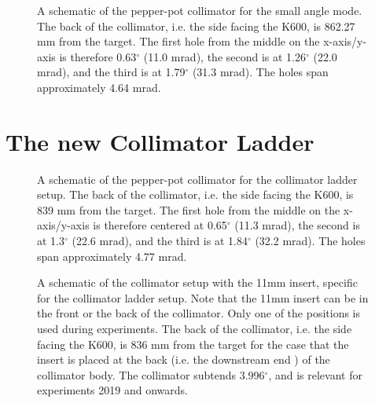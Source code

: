 \documentclass[11pt]{report}
\begin{document}
\begin{figure}[!ht]
\centerline{\vspace{0cm}\hspace{0cm}
}
\centering
\caption{A schematic of the pepper-pot collimator for the small angle mode.
The back of the collimator, i.e. the side facing the K600, is 862.27 mm from the target.  
The first hole from the middle on the x-axis/y-axis is therefore  
0.63$^{\circ}$ (11.0 mrad), 
the second is at 1.26$^{\circ}$ (22.0 mrad), 
and the third is at 1.79$^{\circ}$ (31.3 mrad). 
The holes span approximately 4.64 mrad. 
}
\label{fig:collimator-pepperpot-smallangle}
\end{figure} 

\clearpage


\section{The new Collimator Ladder}

\begin{figure}[!ht]
\centerline{\vspace{0cm}\hspace{0cm}
}
\centering
\caption{A schematic of the pepper-pot collimator for the collimator ladder setup.
The back of the collimator, i.e. the side facing the K600, is 839 mm from the target.  
The first hole from the middle on the x-axis/y-axis is therefore centered at  
0.65$^{\circ}$ (11.3 mrad), 
the second is at 1.3$^{\circ}$ (22.6 mrad), 
and the third is at 1.84$^{\circ}$ (32.2 mrad). 
The holes span approximately 4.77 mrad. 
}
\label{fig:collimatorladder-pepperpot}
\end{figure} 


\begin{figure}[!ht]
\centerline{\vspace{0cm}\hspace{0cm}
}
\centering
\caption{A schematic of the collimator setup with the 11mm insert, specific for the collimator ladder setup.
Note that the 11mm insert can be in the front or the back of the collimator. Only one of the positions
is used during experiments.
The back of the collimator, i.e. the side facing the K600, is 836 mm from the target 
for the case that the insert is placed at the back (i.e. the downstream end ) of the collimator body.
The collimator subtends 3.996$^{\circ}$, and is relevant for experiments 2019 and onwards.
}
\label{fig:collimatorladder-11mm}
\end{figure} 
\end{document}
